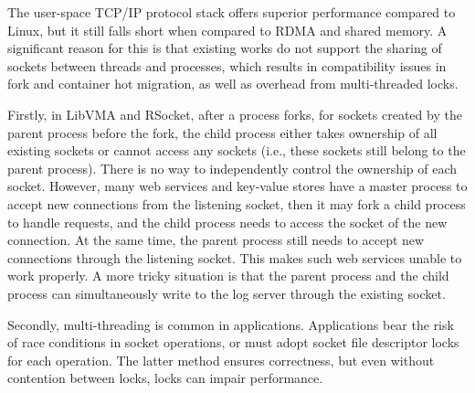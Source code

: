 The user-space TCP/IP protocol stack offers superior performance compared to Linux, but it still falls short when compared to RDMA and shared memory. A significant reason for this is that existing works do not support the sharing of sockets between threads and processes, which results in compatibility issues in fork and container hot migration, as well as overhead from multi-threaded locks.

Firstly, in LibVMA and RSocket, after a process forks, for sockets created by the parent process before the fork, the child process either takes ownership of all existing sockets or cannot access any sockets (i.e., these sockets still belong to the parent process). There is no way to independently control the ownership of each socket. However, many web services \cite{apache,nginx,php-fpm,python-gunicorn,vsftpd} and key-value stores \cite{memcached} have a master process to accept new connections from the listening socket, then it may fork a child process to handle requests, and the child process needs to access the socket of the new connection. At the same time, the parent process still needs to accept new connections through the listening socket. This makes such web services unable to work properly. A more tricky situation is that the parent process and the child process can simultaneously write to the log server through the existing socket.

Secondly, multi-threading is common in applications. Applications bear the risk of race conditions in socket operations, or must adopt socket file descriptor locks for each operation. The latter method ensures correctness, but even without contention between locks, locks can impair performance.

